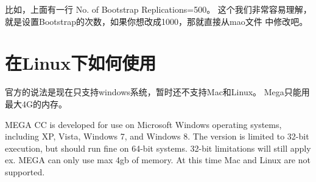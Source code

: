 \documentclass{ctexart}
\begin{document}
比如，上面有一行 No. of Bootstrap Replications=500。
这个我们非常容易理解，就是设置Bootstrap的次数，如果你想改成1000，那就直接从mao文件
中修改吧。
\section{在Linux下如何使用}
\label{sec-5}

官方的说法是现在只支持windows系统，暂时还不支持Mac和Linux。
Mega只能用最大4G的内存。

MEGA CC is developed for use on Microsoft Windows operating systems, 
including XP, Vista, Windows 7, and Windows 8. 
The version is limited to 32-bit execution, but should run fine on 64-bit systems.
32-bit limitations will still apply ex. 
MEGA can only use max 4gb of memory. 
At this time Mac and Linux are not supported.
\end{document}
